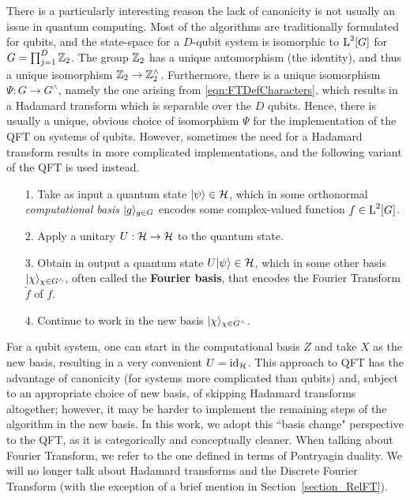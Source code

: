 There is a particularly interesting reason the lack of canonicity is not usually an issue in quantum computing. Most of the algorithms are traditionally formulated for qubits, and the state-space for a $D$-qubit system is isomorphic to $\operatorname{L}^2[G]$ for $G = \prod_{j=1}^D \mathbb{Z}_{2}$. The group $\mathbb{Z}_{2}$ has a unique automorphism (the identity), and thus a unique isomorphism $\mathbb{Z}_{2} \rightarrow \mathbb{Z}_{2}^\wedge$. Furthermore, there is a unique isomorphism $\Psi : G \rightarrow G^\wedge$, namely the one arising from \eqref{eqn:FTDefCharacters}, which results in a Hadamard transform which is separable over the $D$ qubits. Hence, there is usually a unique, obvious choice of isomorphism $\Psi$ for the implementation of the QFT on systems of qubits. However, sometimes the need for a Hadamard transform results in more complicated implementations, and the following variant of the QFT is used instead.
\begin{enumerate}
  \item[1.] Take as input a quantum state $| \psi \rangle \in  \mathcal{H}$, which in some orthonormal \textit{computational basis} $| g \rangle_{g\in G}$ encodes some complex-valued function $f \in \operatorname{L}^2[G]$.
  \item[2.] Apply a unitary $U : \mathcal{H} \rightarrow \mathcal{H}$ to the quantum state.
  \item[3.] Obtain in output a quantum state $U| \psi \rangle \in \mathcal{H}$, which in some other basis $| \chi \rangle_{\chi\in G^\wedge}$, often called the \textbf{Fourier basis}, that encodes the Fourier Transform $\tilde{f}$ of $f$.
  \item[4.] Continue to work in the new basis $| \chi \rangle_{\chi\in G^\wedge}$.
\end{enumerate}

For a qubit system, one can start in the computational basis $Z$ and take $X$ as the new basis, resulting in a very convenient $U = \mbox{id}_{\mathcal{H}}$. This approach to QFT has the advantage of canonicity (for systems more complicated than qubits) and, subject to an appropriate choice of new basis, of skipping Hadamard transforms altogether; however, it may be harder to implement the remaining steps of the algorithm in the new basis. In this work, we  adopt this ``basis change" perspective to the QFT, as it is categorically and conceptually cleaner. When talking about Fourier Transform, we refer to the one defined in terms of Pontryagin duality. We will no longer talk about Hadamard transforms and the Discrete Fourier Transform (with the exception of a brief mention in Section~\ref{section_RelFT}).

